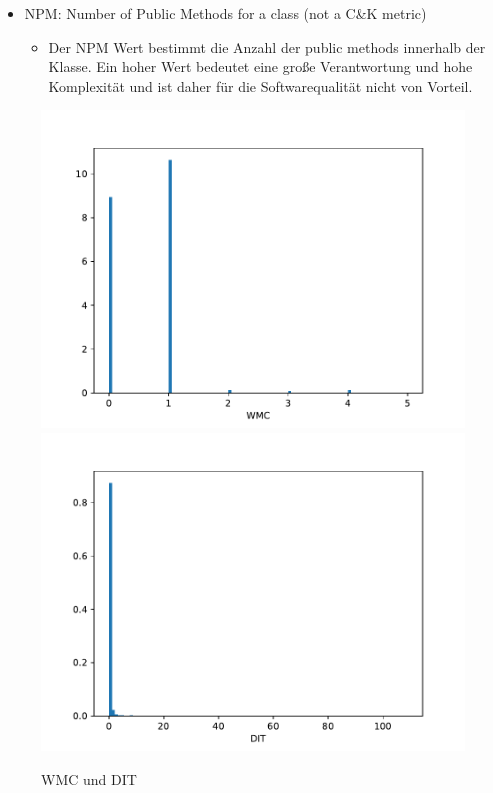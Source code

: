 \documentclass{scrreprt}
\begin{document}
\begin{itemize}
\item NPM: Number of Public Methods for a class (not a C\&K metric)
    \begin{itemize}
    \item Der NPM Wert bestimmt die Anzahl der public methods innerhalb der Klasse. Ein hoher Wert bedeutet eine große Verantwortung und hohe Komplexität und ist daher für die Softwarequalität nicht von Vorteil.
    \end{itemize}

\end{itemize}

\begin{figure}
 \includegraphics[width=.45\textwidth]{./WMC.pdf}
  \includegraphics[width=.45\textwidth]{./DIT.pdf}
 \caption{WMC und DIT}
 \label{abb:wmc}
\end{figure}

\end{document}
